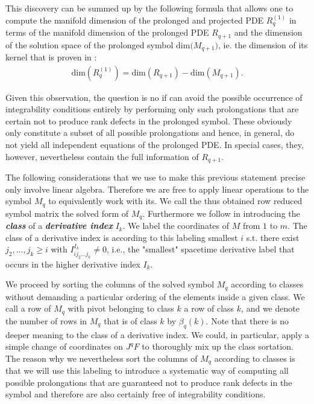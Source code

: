 This discovery can be summed up by the following formula that allows one to compute the manifold dimension of the prolonged and projected PDE $R_q^{(1)}$ in terms of the manifold dimension of the prolonged PDE $R_{q+1}$ and the dimension of the solution space of the prolonged symbol $\mathrm{dim(}M_{q+1})$, ie. the dimension of its kernel that is proven in \cite{seiler1994analysis}:
\begin{align}
    \mathrm{dim}(R_{q}^{(1)}) = \mathrm{dim}(R_{q+1}) - \mathrm{dim}(M_{q+1}).
\end{align}

Given this observation, the question is no if can avoid the possible occurrence of integrability conditions entirely by performing only such prolongations that are certain not to produce rank defects in the prolonged symbol. These obviously only constitute a subset of all possible prolongations and hence, in general, do not yield all independent equations of the prolonged PDE. In special cases, they, however, nevertheless contain the full information of $R_{q+1}$.

The following considerations that we use to make this previous statement precise only involve linear algebra. Therefore we are free to apply linear operations to the symbol $M_q$ to equivalently work with its. We call the thus obtained row reduced symbol matrix the solved form of $M_q$. Furthermore we follow \cite{seiler1994analysis} in introducing the \textit{\textbf{class}} of a \textit{\textbf{derivative index}} $I_k$. We label the coordinates of $M$ from $1$ to $m$. The class of a derivative index is according to this labeling smallest $i$ s.t. there exist $j_2,...,j_k\geq i$ with $I^{I_k}_{ij_2...j_k} \neq 0$, i.e., the "smallest" spacetime derivative label that occurs in the higher derivative index $I_k$.

We proceed by sorting the columns of the solved symbol $M_q$ according to classes without demanding a particular ordering of the elements inside a given class. We call a row of $M_q$ with pivot belonging to class $k$ a row of class $k$, and we denote the number of rows in $M_q$ that is of class $k$ by $\beta_q(k)$. Note that there is no deeper meaning to the class of a derivative index. We could, in particular, apply a simple change of coordinates on $J^qF$ to thoroughly mix up the class sortation. The reason why we nevertheless sort the columns of $M_q$ according to classes is that we will use this labeling to introduce a systematic way of computing all possible prolongations that are guaranteed not to produce rank defects in the symbol and therefore are also certainly free of integrability conditions.

